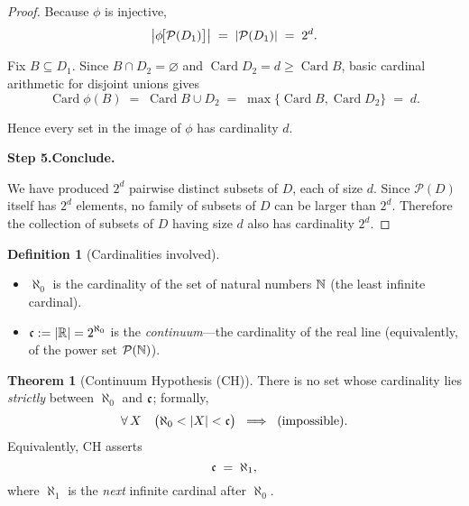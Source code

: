 \documentclass[12pt]{article}
\DeclareMathOperator{\card}{Card}
\theoremstyle{definition} %
\newtheorem{theorem}{Theorem}
\newtheorem{definition}{Definition}
\theoremstyle{plain} %
\begin{document}
\begin{proof}
  Because \(\phi\) is injective,
  \[
    \bigl|\phi\!\bigl[\mathcal P(D_{1})\bigr]\bigr|
    \;=\;
    \abs{\mathcal P(D_{1})}
    \;=\;
    2^{d}.
  \]
  
  Fix \(B\subseteq D_{1}\).
  Since \(B\cap D_{2}=\varnothing\) and
  \(\card{D_{2}}=d\ge\card{B}\),
  basic cardinal arithmetic for disjoint unions gives
  \[
    \card{\phi(B)}
    \;=\;
    \card{B\cup D_{2}}
    \;=\;
    \max\!\bigl\{\card{B},\card{D_{2}}\bigr\}
    \;=\;
    d.
  \]
  
  Hence every set in the image of \(\phi\) has cardinality \(d\).
  
  \bigskip
  \textbf{Step 5.\@ Conclude.}
  
  We have produced \(2^{d}\) pairwise distinct subsets of \(D\),
  each of size \(d\).
  Since \(\mathcal P(D)\) itself has \(2^{d}\) elements, no family of
  subsets of \(D\) can be larger than \(2^{d}\).
  Therefore the collection of subsets of \(D\) having size \(d\)
  also has cardinality \(2^{d}\).
  \end{proof}
\begin{definition}[Cardinalities involved]
  \begin{itemize}
    \item \(\displaystyle\aleph_{0}\) is the cardinality of the set
          of natural numbers \(\Bbb N\) (the least infinite cardinal).
    \item \(\displaystyle\frak c := |\Bbb R| = 2^{\aleph_{0}}\) is the
          \emph{continuum}––the cardinality of the real line
          (equivalently, of the power set \(\mathcal P(\Bbb N)\)).
  \end{itemize}
  \end{definition}
  
  \begin{theorem}[Continuum Hypothesis (CH)]
  \label{thm:CH}
  There is no set whose cardinality lies \emph{strictly} between
  \(\aleph_{0}\) and \(\frak c\); formally,
  \[
    \forall\,X
    \quad
    \bigl(
        \aleph_{0}<|X|<\frak c
    \bigr)
    \;\;\Longrightarrow\;\;
    \text{(impossible)} .
  \]
  Equivalently, CH asserts
  \[
    \frak c \;=\; \aleph_{1},
  \]
  where \(\aleph_{1}\) is the \emph{next} infinite cardinal after
  \(\aleph_{0}\).
  \end{theorem}
  
\end{document}
